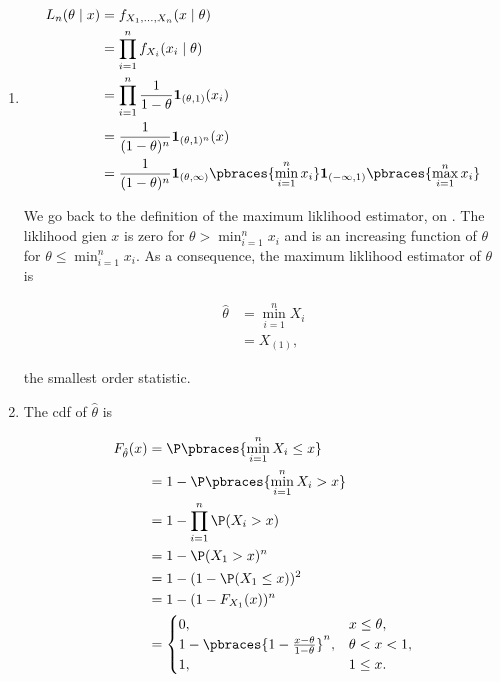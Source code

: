 \begin{solution}

\phantom{}

\begin{enumerate}[label = (\alph*)]

    \item

    \begin{align*}
        L_n(\theta \mid x)
        & =
        f_{X_1, \dots, X_n}(x \mid \theta) \\
        & =
        \prod_{i=1}^n
            f_{X_i}(x_i \mid \theta) \\
        & =
        \prod_{i=1}^n
            \frac{1}{1 - \theta} \mathbf 1_{(\theta, 1)}(x_i) \\
        & =
        \frac{1}{(1 - \theta)^n} \mathbf 1_{(\theta, 1)^n}(x) \\
        & =
        \frac{1}{(1 - \theta)^n}
        \mathbf 1_{(\theta, \infty)}
        \pbraces
        {
            \min_{i=1}^n x_i
        }
        \mathbf 1_{(-\infty, 1)}
        \pbraces
        {
            \max_{i=1}^n x_i
        }
    \end{align*}

    We go back to the definition of the maximum liklihood estimator, on \cite*[lecture 6, slide 47]{EStat}.
    The liklihood gien $x$ is zero for $\theta > \min_{i=1}^n x_i$ and is an increasing function of $\theta$ for $\theta \leq \min_{i=1}^n x_i$.
    As a consequence, the maximum liklihood estimator of $\theta$ is

    \begin{align*}
        \hat \theta
        & =
        \min_{i=1}^n X_i \\
        & =
        X_{(1)},
    \end{align*}

    the smallest order statistic.

    \item The cdf of $\hat \theta$ is

    \begin{align*}
        F_{\hat \theta}(x)
        & =
        \P \pbraces{\min_{i=1}^n X_i \leq x} \\
        & =
        1 - \P \pbraces{\min_{i=1}^n X_i > x} \\
        & =
        1 - \prod_{i=1}^n \P(X_i > x) \\
        & =
        1 - \P(X_1 > x)^n \\
        & =
        1 - (1 - \P(X_1 \leq x))^2 \\
        & =
        1 - (1 - F_{X_1}(x))^n \\
        & =
        \begin{cases}
            0,
            & x \leq \theta, \\
            1 - \pbraces{1 - \frac{x - \theta}{1 - \theta}}^n,
            & \theta < x < 1, \\
            1,
            & 1 \leq x.
        \end{cases}
    \end{align*}


\end{enumerate}
\end{solution}
